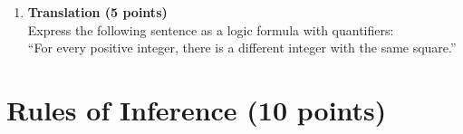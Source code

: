 \documentclass[11pt]{article}
\def\sectionOneA#1{}
\def\sectionOneB#1{}
\def\sectionTwoA#1{}
\def\sectionTwoB#1{}
\def\sectionVicsection#1{#1}
\newcounter{pgpts}
\newcounter{cumpts}
\newcommand{\cnewpage}{\addtocounter{cumpts}{\value{pgpts}}\newpage\setcounter{pgpts}{0}}
\begin{document}
\begin{enumerate}
\vspace*{3cm}



\item {\bf Translation (5 points)}\\

Express the following sentence as a logic formula with
quantifiers:\\[1ex]

\sectionOneA{''For every integer there is a real number such that both sum up to zero.''}
\sectionOneB{''For every integer there is a rational number such that both sum up to zero.''} %
\sectionTwoA{''For every positive integer there is a rational number such that their product\\ equals 1.''}
\sectionTwoB{''For every positive integer there is a real number such that their product equals 1.''} %
\sectionVicsection{``For every positive integer, there is a different integer with the same square.''}





\end{enumerate}




\cnewpage





\section{Rules of Inference (10 points)}\addtocounter{pgpts}{10}
\end{document}
